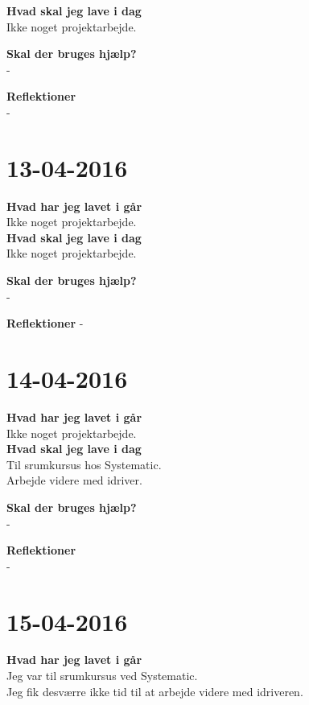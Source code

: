 \documentclass{article}
\begin{document}
	\textbf{Hvad skal jeg lave i dag}\\
	Ikke noget projektarbejde.
	
	\textbf{Skal der bruges hjælp?}\\
	-
	
	\textbf{Reflektioner}\\
	-
	
	
	
	\section{13-04-2016}
	
	\textbf{Hvad har jeg lavet i går}\\
	Ikke noget projektarbejde.\\
	
	\textbf{Hvad skal jeg lave i dag}\\
	Ikke noget projektarbejde.
	
	\textbf{Skal der bruges hjælp?}\\
	-
	
	\textbf{Reflektioner}
	-
	
	
	
	\section{14-04-2016}
	
	\textbf{Hvad har jeg lavet i går}\\
	Ikke noget projektarbejde.\\
	
	\textbf{Hvad skal jeg lave i dag}\\
	Til srumkursus hos Systematic.
	\\Arbejde videre med idriver.
	
	\textbf{Skal der bruges hjælp?}\\
	-
	
	\textbf{Reflektioner}\\
	-
	
	
	
	\section{15-04-2016}
	
	\textbf{Hvad har jeg lavet i går}\\
	Jeg var til srumkursus ved Systematic.\\
	Jeg fik desværre ikke tid til at arbejde videre med idriveren.\\
	
\end{document}
